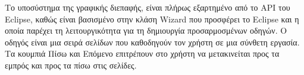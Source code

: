 Το υποσύστημα της γραφικής διεπαφής, είναι πλήρως εξαρτημένο από το API του Eclipse, καθώς είναι 
βασισμένο στην κλάση Wizard που προσφέρει το Eclipse και η οποία παρέχει τη λειτουργικότητα για τη δημιουργία 
προσαρμοσμένων οδηγών. Ο οδηγός είναι μια σειρά σελίδων που καθοδηγούν τον χρήστη σε μια σύνθετη εργασία. 
Τα κουμπιά Πίσω και Επόμενο επιτρέπουν στο χρήστη να μετακινείται προς τα εμπρός και προς τα πίσω στις σελίδες. 
